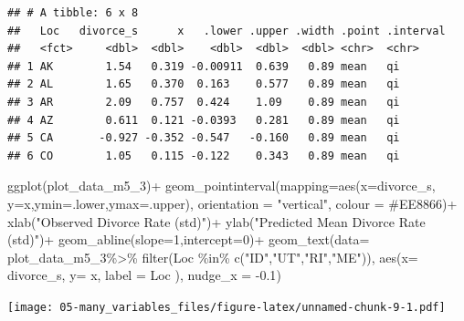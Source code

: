 \documentclass[
]{book}
\newenvironment{Shaded}{\begin{snugshade}}{\end{snugshade}}
\newcommand{\AttributeTok}[1]{\textcolor[rgb]{0.77,0.63,0.00}{#1}}
\newcommand{\DecValTok}[1]{\textcolor[rgb]{0.00,0.00,0.81}{#1}}
\newcommand{\FloatTok}[1]{\textcolor[rgb]{0.00,0.00,0.81}{#1}}
\newcommand{\FunctionTok}[1]{\textcolor[rgb]{0.00,0.00,0.00}{#1}}
\newcommand{\NormalTok}[1]{#1}
\newcommand{\SpecialCharTok}[1]{\textcolor[rgb]{0.00,0.00,0.00}{#1}}
\newcommand{\StringTok}[1]{\textcolor[rgb]{0.31,0.60,0.02}{#1}}
\begin{document}
\begin{verbatim}
## # A tibble: 6 x 8
##   Loc   divorce_s      x   .lower .upper .width .point .interval
##   <fct>     <dbl>  <dbl>    <dbl>  <dbl>  <dbl> <chr>  <chr>    
## 1 AK        1.54   0.319 -0.00911  0.639   0.89 mean   qi       
## 2 AL        1.65   0.370  0.163    0.577   0.89 mean   qi       
## 3 AR        2.09   0.757  0.424    1.09    0.89 mean   qi       
## 4 AZ        0.611  0.121 -0.0393   0.281   0.89 mean   qi       
## 5 CA       -0.927 -0.352 -0.547   -0.160   0.89 mean   qi       
## 6 CO        1.05   0.115 -0.122    0.343   0.89 mean   qi
\end{verbatim}

\begin{Shaded}
\begin{Highlighting}[]
  \FunctionTok{ggplot}\NormalTok{(plot\_data\_m5\_3)}\SpecialCharTok{+}
  \FunctionTok{geom\_pointinterval}\NormalTok{(}\AttributeTok{mapping=}\FunctionTok{aes}\NormalTok{(}\AttributeTok{x=}\NormalTok{divorce\_s, }\AttributeTok{y=}\NormalTok{x,}\AttributeTok{ymin=}\NormalTok{.lower,}\AttributeTok{ymax=}\NormalTok{.upper), }
                     \AttributeTok{orientation =} \StringTok{"vertical"}\NormalTok{,}
                     \AttributeTok{colour =} \StringTok{\textquotesingle{}\#EE8866\textquotesingle{}}\NormalTok{)}\SpecialCharTok{+}
  \FunctionTok{xlab}\NormalTok{(}\StringTok{"Observed Divorce Rate (std)"}\NormalTok{)}\SpecialCharTok{+}
  \FunctionTok{ylab}\NormalTok{(}\StringTok{"Predicted Mean Divorce Rate (std)"}\NormalTok{)}\SpecialCharTok{+}
  \FunctionTok{geom\_abline}\NormalTok{(}\AttributeTok{slope=}\DecValTok{1}\NormalTok{,}\AttributeTok{intercept=}\DecValTok{0}\NormalTok{)}\SpecialCharTok{+}
  \FunctionTok{geom\_text}\NormalTok{(}\AttributeTok{data=}\NormalTok{   plot\_data\_m5\_3}\SpecialCharTok{\%\textgreater{}\%}
                      \FunctionTok{filter}\NormalTok{(Loc }\SpecialCharTok{\%in\%} \FunctionTok{c}\NormalTok{(}\StringTok{"ID"}\NormalTok{,}\StringTok{"UT"}\NormalTok{,}\StringTok{"RI"}\NormalTok{,}\StringTok{"ME"}\NormalTok{)),}
    \FunctionTok{aes}\NormalTok{(}\AttributeTok{x=}\NormalTok{ divorce\_s, }\AttributeTok{y=}\NormalTok{ x, }\AttributeTok{label =}\NormalTok{ Loc ), }\AttributeTok{nudge\_x =} \SpecialCharTok{{-}}\FloatTok{0.1}\NormalTok{)}
\end{Highlighting}
\end{Shaded}

\texttt{[image: 05-many\_variables\_files/figure-latex/unnamed-chunk-9-1.pdf]}
\end{document}
